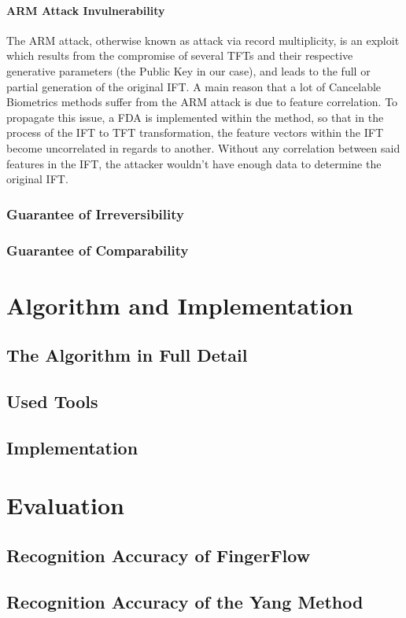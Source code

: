 \documentclass[fyp]{socreport}
\begin{document}
\subsubsection{ARM Attack Invulnerability}
The ARM attack, otherwise known as attack via record multiplicity, is an exploit which results from the compromise of several TFTs and their respective generative parameters (the Public Key in our case), and leads to the full or partial generation of the original IFT. A main reason that a lot of Cancelable Biometrics methods suffer from the ARM attack is due to feature correlation. To propagate this issue, a FDA is implemented within the method, so that in the process of the IFT to TFT transformation, the feature vectors within the IFT become uncorrelated in regards to another. Without any correlation between said features in the IFT, the attacker wouldn't have enough data to determine the original IFT.

\subsection{Guarantee of Irreversibility}
\subsection{Guarantee of Comparability}

\chapter{Algorithm and Implementation}
\section{The Algorithm in Full Detail}
\section{Used Tools}
\section{Implementation}

\chapter{Evaluation}
\section{Recognition Accuracy of FingerFlow}
\section{Recognition Accuracy of the Yang Method}
\end{document}
